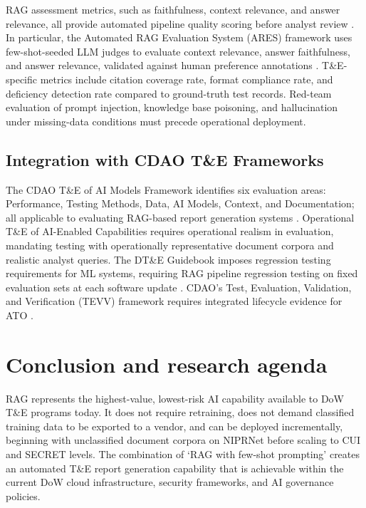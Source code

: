 \documentclass[12pt,letterpaper]{article}
\let\cite\parencite
\begin{document}
RAG assessment metrics, such as faithfulness, context relevance, and answer relevance, all provide automated pipeline quality scoring before analyst review \cite{promptingguide_rag2024}. In particular, the Automated RAG Evaluation System (ARES) framework uses few-shot-seeded LLM judges to evaluate context relevance, answer faithfulness, and answer relevance, validated against human preference annotations \cite{ares2024}. T\&E-specific metrics include citation coverage rate, format compliance rate, and deficiency detection rate compared to ground-truth test records. Red-team evaluation of prompt injection, knowledge base poisoning, and hallucination under missing-data conditions must precede operational deployment.

\subsection{Integration with CDAO T\&E Frameworks}

The CDAO T\&E of AI Models Framework identifies six evaluation areas: Performance, Testing Methods, Data, AI Models, Context, and Documentation; all applicable to evaluating RAG-based report generation systems \cite{domino2025}. Operational T\&E of AI-Enabled Capabilities requires operational realism in evaluation, mandating testing with operationally representative document corpora and realistic analyst queries. The DT\&E Guidebook imposes regression testing requirements for ML systems, requiring RAG pipeline regression testing on fixed evaluation sets at each software update \cite{dtea2025}. CDAO's Test, Evaluation, Validation, and Verification (TEVV) framework requires integrated lifecycle evidence for ATO \cite{nas2023}.

\section{Conclusion and research agenda}

RAG represents the highest-value, lowest-risk AI capability available to DoW T\&E programs today. It does not require retraining, does not demand classified training data to be exported to a vendor, and can be deployed incrementally, beginning with unclassified document corpora on NIPRNet before scaling to CUI and SECRET levels. The combination of `RAG with few-shot prompting' creates an automated T\&E report generation capability that is achievable within the current DoW cloud infrastructure, security frameworks, and AI governance policies.
\end{document}
